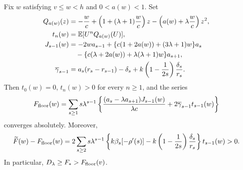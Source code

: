 \begin{lemma}\label{lem:mellin-floor}
Fix $w$ satisfying $v\le w<h$ and $0<a(w)<1$.
Set
\begin{align}
 Q_{a(w)}(z)&=-\frac wc+\left(1+(\lambda+1)\frac wc\right)z
                   -\left(a(w)+\lambda\frac wc\right)z^2,
 \nonumber\\
 t_n(w)&=\mathbb E[U^nQ_{a(w)}(U)],\label{eq:assigned-t}\\
 J_{s-1}(w)&=-2w a_{s-1}
  +\{c(1+2a(w))+(3\lambda+1)w\}a_s
  \nonumber\\
 &\quad-\{c(\lambda+2a(w))+\lambda(\lambda+1)w\}a_{s+1},
 \label{eq:assigned-J}\\
 \overline\gamma_{s-1}
 &=a_s(r_s-r_{s-1})-\delta_s
   +k\left(1-\frac1{2s}\right)\frac{\delta_s}{r_s}.
 \label{eq:gamma-floor}
\end{align}
Then $t_0(w)=0$, $t_n(w)>0$ for every $n\ge1$, and the series
\begin{equation}\label{eq:complete-mellin-floor}
 F_{\rm floor}(w)=\sum_{s\ge1}s\lambda^{s-1}
 \left\{\frac{(a_s-\lambda a_{s+1})J_{s-1}(w)}{\lambda c}
             +2\overline\gamma_{s-1}t_{s-1}(w)\right\}
\end{equation}
converges absolutely.  Moreover,
\begin{equation}\label{eq:strict-Mellin-gap}
 \widetilde F(w)-F_{\rm floor}(w)
 =2\sum_{s\ge2}s\lambda^{s-1}
 \left\{k\beta_s[-\rho'(s)]
 -k\left(1-\frac1{2s}\right)\frac{\delta_s}{r_s}\right\}
 t_{s-1}(w)>0.
\end{equation}
In particular, $D_\lambda\ge F_*>F_{\rm floor}(v)$.
\end{lemma}
